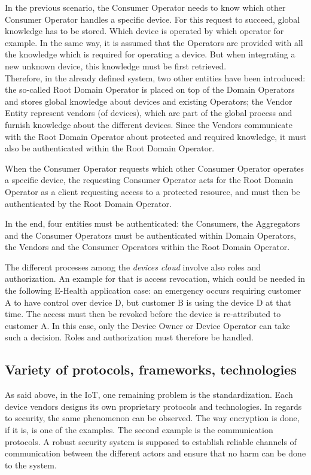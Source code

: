 In the previous scenario, the Consumer Operator needs to know which other Consumer Operator handles a specific device. For this request to succeed, global knowledge has to be stored. Which device is operated by which operator for example. In the same way, it is assumed that the Operators are provided with all the knowledge which is required for operating a device. But when integrating a new unknown device, this knowledge must be first retrieved. \\Therefore, in the already defined system, two other entities have been introduced: the so-called Root Domain Operator is placed on top of the Domain Operators and stores global knowledge about devices and existing Operators; the Vendor Entity represent vendors (of devices), which are part of the global process and furnish knowledge about the different devices. Since the Vendors communicate with the Root Domain Operator about protected and required knowledge, it must also be authenticated within the Root Domain Operator. 

When the Consumer Operator requests which other Consumer Operator operates a specific device, the requesting Consumer Operator acts for the Root Domain Operator as a client requesting access to a protected resource, and must then be authenticated by the Root Domain Operator.

In the end, four entities must be authenticated: the Consumers, the Aggregators and the Consumer Operators must be authenticated within Domain Operators, the Vendors and the Consumer Operators within the Root Domain Operator.

The different processes among the \emph{devices cloud} involve also roles and authorization. An example for that is access revocation, which could be needed in the following E-Health application case: an emergency occurs requiring customer A to have control over device D, but customer B is using the device D at that time. The access must then be revoked before the device is re-attributed to customer A. In this case, only the Device Owner or Device Operator can take such a decision. Roles and authorization must therefore be handled.

\subsection{Variety of protocols, frameworks, technologies}
As said above, in the IoT, one remaining problem is the standardization. Each device vendors designs its own proprietary protocols and technologies. In regards to security, the same phenomenon can be observed. The way encryption is done, if it is, is one of the examples. The second example is the communication protocols. A robust security system is supposed to establish reliable channels of communication between the different actors and ensure that no harm can be done to the system. 


